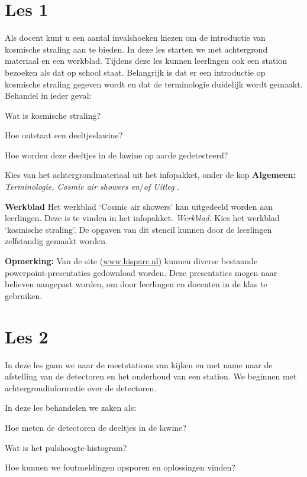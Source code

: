 \section{Les 1}

Als docent kunt u een aantal invalshoeken kiezen om de introductie van
kosmische straling aan te bieden.  In deze les starten we met
achtergrond materiaal en een werkblad. Tijdens deze les kunnen
leerlingen ook een station bezoeken als dat op school staat. Belangrijk
is dat er een introductie op kosmische straling gegeven wordt en dat de
terminologie duidelijk wordt gemaakt.
Behandel in ieder geval:
\begin{description}
    \item{Wat is kosmische straling?}
    \item{Hoe ontstaat een deeltjeslawine?}
    \item{Hoe worden deze deeltjes in de lawine op aarde gedetecteerd?}
\end{description}
Kies van het achtergrondmateriaal uit het infopakket, onder de kop
\textbf{Algemeen:}  \textit{Terminologie, Cosmic air showers en$/$of Uitleg \hisparc}.

\textbf{Werkblad} Het werkblad `Cosmic air showers' kan uitgedeeld worden aan 
leerlingen. Deze is te vinden in het infopakket.
\textit{Werkblad}. Kies het werkblad `kosmische straling'.
De opgaven van dit stencil kunnen door de leerlingen zelfstandig gemaakt worden.

\textbf{Opmerking:}
Van de \hisparc site (\url{www.hisparc.nl}) kunnen diverse bestaande powerpoint-presentaties 
gedownload worden.
Deze presentaties mogen naar believen aangepast worden, om door leerlingen en docenten 
in de klas te gebruiken.

\section{Les 2}
In deze les gaan we naar de meetstations van \hisparc kijken en met name naar de 
afstelling van de detectoren en het onderhoud van een station.
We beginnen met achtergrondinformatie over de detectoren.

In deze les behandelen we zaken als:
\begin{description}
    \item{Hoe meten de detectoren de deeltjes in de lawine?}
    \item{Wat is het pulshoogte-histogram?}
    \item{Hoe kunnen we foutmeldingen opsporen en oplossingen vinden?}
\end{description}

